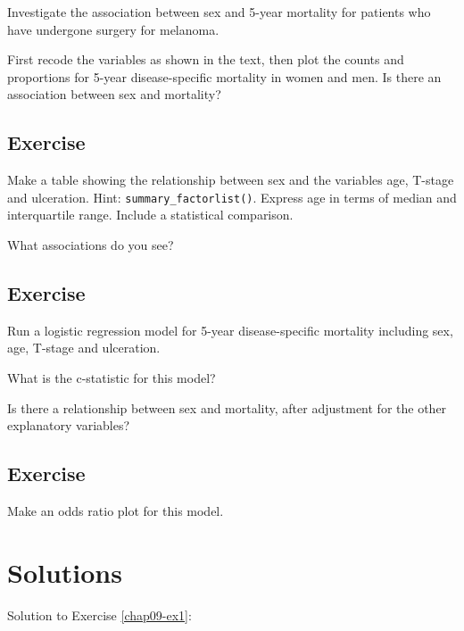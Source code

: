 \documentclass[
  12pt,
  krantz2]{krantz}
\begin{document}
Investigate the association between sex and 5-year mortality for patients who have undergone surgery for melanoma.

First recode the variables as shown in the text, then plot the counts and proportions for 5-year disease-specific mortality in women and men. Is there an association between sex and mortality?

\hypertarget{chap09-ex2}{%
\subsection{Exercise}\label{chap09-ex2}}

Make a table showing the relationship between sex and the variables age, T-stage and ulceration. Hint: \texttt{summary\_factorlist()}.
Express age in terms of median and interquartile range. Include a statistical comparison.

What associations do you see?

\hypertarget{chap09-ex3}{%
\subsection{Exercise}\label{chap09-ex3}}

Run a logistic regression model for 5-year disease-specific mortality including sex, age, T-stage and ulceration.

What is the c-statistic for this model?

Is there a relationship between sex and mortality, after adjustment for the other explanatory variables?

\hypertarget{chap09-ex4}{%
\subsection{Exercise}\label{chap09-ex4}}

Make an odds ratio plot for this model.

\hypertarget{solutions-3}{%
\section{Solutions}\label{solutions-3}}

Solution to Exercise \ref{chap09-ex1}:
\end{document}
